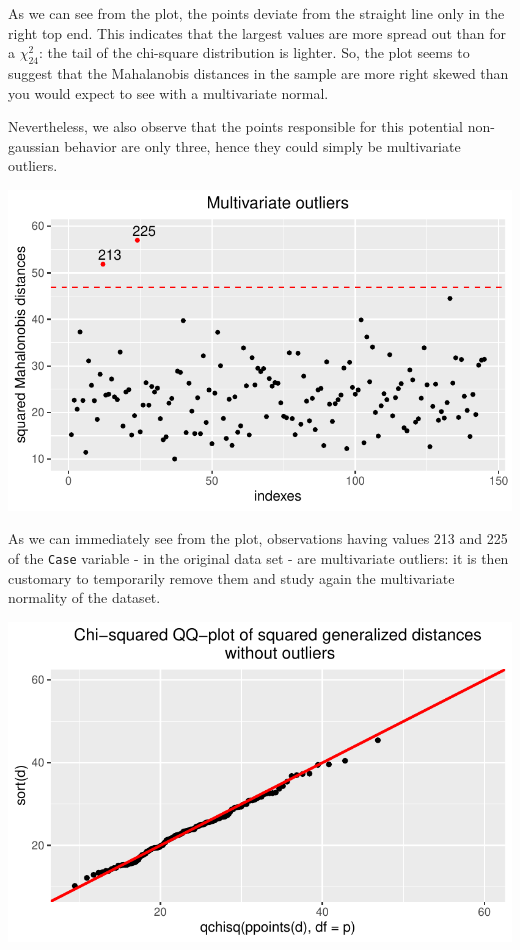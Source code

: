 \documentclass[
  letterpaper,
  DIV=11,
  numbers=noendperiod]{scrartcl}
\begin{document}
As we can see from the plot, the points deviate from the straight line
only in the right top end. This indicates that the largest values are
more spread out than for a \(\chi_{24}^2\): the tail of the chi-square
distribution is lighter. So, the plot seems to suggest that the
Mahalanobis distances in the sample are more right skewed than you would
expect to see with a multivariate normal.

Nevertheless, we also observe that the points responsible for this
potential non-gaussian behavior are only three, hence they could simply
be multivariate outliers.

\includegraphics{ProblemSet2_files/figure-pdf/unnamed-chunk-10-1.pdf}

As we can immediately see from the plot, observations having values 213
and 225 of the \texttt{Case} variable - in the original data set - are
multivariate outliers: it is then customary to temporarily remove them
and study again the multivariate normality of the dataset.

\includegraphics{ProblemSet2_files/figure-pdf/unnamed-chunk-11-1.pdf}
\end{document}
